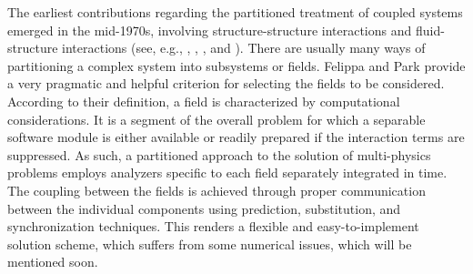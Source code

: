 The earliest contributions regarding the partitioned treatment of coupled systems emerged in the mid-1970s, involving structure-structure interactions and fluid-structure interactions (see, e.g., \cite{belytschko_mesh_1976}, \cite{park_stabilization_1977}, \cite{belytschko_stability_1978}, \cite{hughes_implicit-explicit_1978} and \cite{belytschko_mixed_1979}).
There are usually many ways of partitioning a complex system into subsystems or fields.
Felippa and Park \citep{felippa_staggered_1980} provide a very pragmatic and helpful criterion for selecting the fields to be considered.
According to their definition, a field is characterized by computational considerations.
It is a segment of the overall problem for which a separable software module is either available or readily prepared if the interaction terms are suppressed.
As such, a partitioned approach to the solution of multi-physics problems employs analyzers specific to each field separately integrated in time.
The coupling between the fields is achieved through proper communication between the individual components using prediction, substitution, and synchronization techniques.
This renders a flexible and easy-to-implement solution scheme, which suffers from some numerical issues, which will be mentioned soon.

